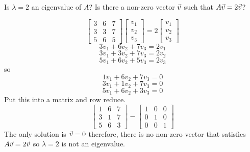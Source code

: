 \documentclass[english, 12pt]{article}
\begin{document}
\begin{exmp}
Is $\lambda=2$ an eigenvalue of $A$? Is there a non-zero vector $\vec{v}$ such that $A\vec{v} = 2 \vec{v}$?

\begin{sol}
\[\begin{bmatrix} 3 & 6 & 7 \\ 3 & 3 & 7 \\ 5 & 6 & 5 \end{bmatrix} \begin{bmatrix} v_{1} \\ v_{2} \\ v_{3} \end{bmatrix} = 2 \begin{bmatrix} v_{1} \\ v_{2} \\ v_{3} \end{bmatrix}\]
\[3v_{1} + 6 v_{2} + 7 v_{3} = 2v_{1}\]
\[3v_{1} + 3v_{2} + 7 v_{3} = 2v_{2}\]
\[5v_{1} + 6v_{2} + 5 v_{3} = 2v_{3}\]
so
\[1v_{1} + 6 v_{2} + 7 v_{3} = 0\]
\[3v_{1} + 1v_{2} + 7 v_{3} = 0\]
\[5v_{1} + 6v_{2} + 3 v_{3} = 0\]
Put this into a matrix and row reduce.
\[\begin{bmatrix} 1 & 6 & 7 \\ 3 & 1 & 7 \\ 5 & 6 & 3\end{bmatrix} - \begin{bmatrix} 1 & 0 & 0 \\ 0 & 1 & 0 \\ 0 & 0 & 1\end{bmatrix}\]
The only solution is $\vec{v} = 0$ therefore, there is no non-zero vector that satisfies $A\vec{v} = 2 \vec{v}$ so $\lambda = 2$ is not an eigenvalue.
\end{sol}
\end{exmp}
\end{document}
